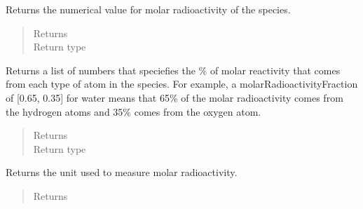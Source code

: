 \documentclass[letterpaper,10pt,openany,oneside,english]{sphinxmanual}
\begin{document}
\begin{fulllineitems}
\begin{fulllineitems}
\label{\detokenize{support_rst/specie:specie.Specie.molarRadioactivity}}
Returns the numerical value for molar radioactivity of the species.
\begin{quote}\begin{description}
\item[{Returns}] \leavevmode
{}

\item[{Return type}] \leavevmode
{}

\end{description}\end{quote}

\end{fulllineitems}


\begin{fulllineitems}
\label{\detokenize{support_rst/specie:specie.Specie.molarRadioactivityFractions}}
Returns a list of numbers that speciefies the \% of molar reactivity
that comes from each type of atom in the species. For example, a
molarRadioactivityFraction of {[}0.65, 0.35{]} for water means that 65\%
of the molar radioactivity comes from the hydrogen atoms and 35\% comes
from the oxygen atom.
\begin{quote}\begin{description}
\item[{Returns}] \leavevmode
{}

\item[{Return type}] \leavevmode
{}

\end{description}\end{quote}

\end{fulllineitems}


\begin{fulllineitems}
\label{\detokenize{support_rst/specie:specie.Specie.molarRadioactivityUnit}}
Returns the unit used to measure molar radioactivity.
\begin{quote}\begin{description}
\item[{Returns}] \leavevmode
{}


\end{description}
\end{quote}
\end{fulllineitems}
\end{fulllineitems}
\end{document}
